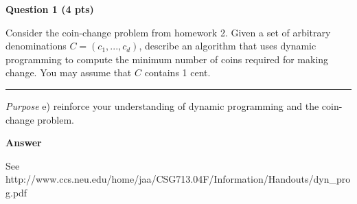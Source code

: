 \documentclass{article}
\newcommand\separator{\rule{\textwidth}{.2pt}}
\begin{document}
\newpage


\begin{framed}
    \textbf{Question 1 (4 pts)}
    
    Consider the coin-change problem from homework 2. Given a set of arbitrary 
    denominations $C =(c_1,...,c_d)$, describe an algorithm that uses dynamic 
    programming to compute the minimum number of coins required for making 
    change. You may assume that $C$ contains 1 cent.

    \separator

    \textit{Purpose} e) reinforce your understanding of dynamic programming and 
    the coin-change problem.

\end{framed}


\textbf{Answer}

See http://www.ccs.neu.edu/home/jaa/CSG713.04F/Information/Handouts/dyn_prog.pdf



\newpage




\end{document}
